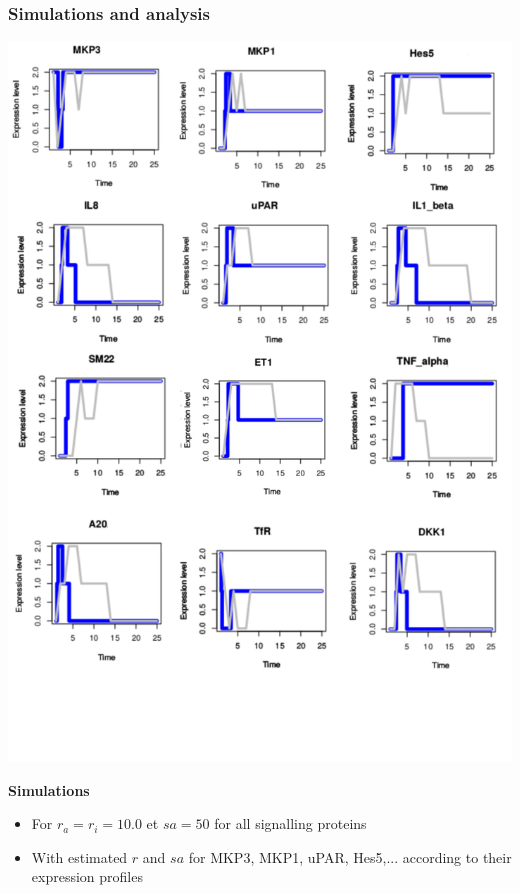 \begin{frame}[c]
  \frametitle{Simulations and analysis}
  
 \begin{center}
  \includegraphics[scale=0.15]{figs/12genes_sim.png}
\end{center}

\textbf{Simulations}

\begin{itemize}
  \item For $r_{a} = r_{i}=10.0$ et $sa = 50 $ for all signalling proteins
  \item With estimated $r$ and $sa$ for MKP3, MKP1, uPAR, Hes5,... according to their expression profiles
  
\end{itemize}


\end{frame}




